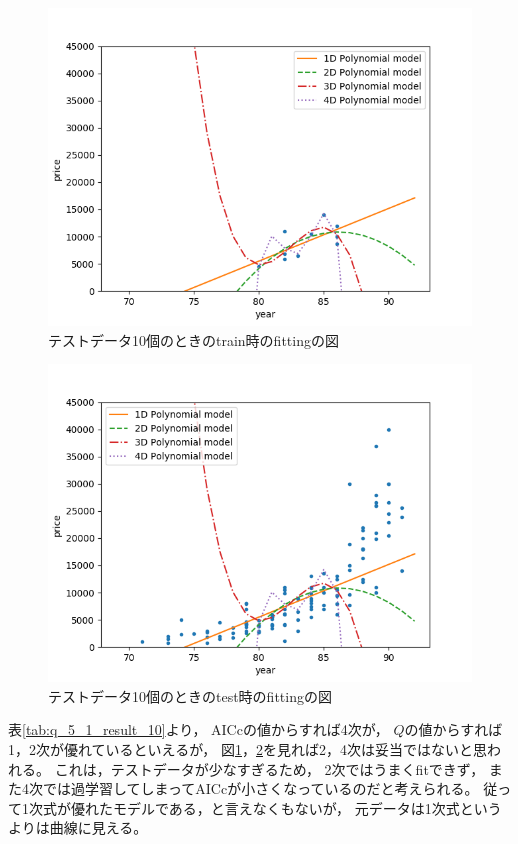 \documentclass[class=jsarticle, crop=false, dvipdfmx, fleqn]{standalone}
\begin{document}
\begin{figure}[H]%
	\centering
	\includegraphics[clip, width=0.8\linewidth]{../figures/q_5_1_train_10}
	\caption{テストデータ10個のときのtrain時のfittingの図}
	\label{fig:q_5_1_train_10}
\end{figure}
\begin{figure}[H]%
	\centering
	\includegraphics[clip, width=0.8\linewidth]{../figures/q_5_1_test_10}
	\caption{テストデータ10個のときのtest時のfittingの図}
	\label{fig:q_5_1_test_10}
\end{figure}

表\ref{tab:q_5_1_result_10}より，
AICcの値からすれば4次が，
$Q$の値からすれば1，2次が優れているといえるが，
図\ref{fig:q_5_1_train_10}，\ref{fig:q_5_1_test_10}を見れば2，4次は妥当ではないと思われる。
これは，テストデータが少なすぎるため，
2次ではうまくfitできず，
また4次では過学習してしまってAICcが小さくなっているのだと考えられる。
従って1次式が優れたモデルである，と言えなくもないが，
元データは1次式というよりは曲線に見える。
\end{document}
